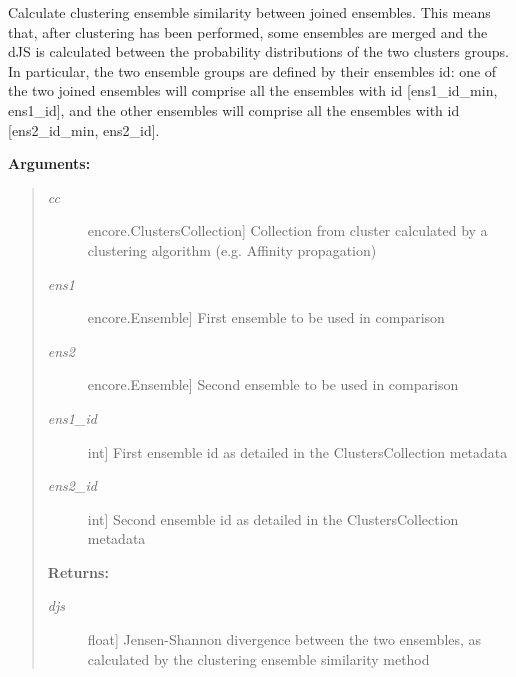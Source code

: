 \documentclass[letterpaper,10pt,english]{sphinxmanual}
\begin{document}
\begin{fulllineitems}
\label{index:encore.similarity.cumulative_clustering_ensemble_similarity}
Calculate clustering ensemble similarity between joined ensembles. This means that, after clustering has been performed, some ensembles are merged and the dJS is calculated between the probability distributions of the two clusters groups. In particular, the two ensemble groups are defined by their ensembles id: one of the two joined ensembles will comprise all the ensembles with id {[}ens1\_id\_min, ens1\_id{]}, and the other ensembles will comprise all the ensembles with id {[}ens2\_id\_min, ens2\_id{]}.

\textbf{Arguments:}
\begin{quote}
\begin{description}
\item[{\emph{cc}}] \leavevmode{[}encore.ClustersCollection{]}
Collection from cluster calculated by a clustering algorithm (e.g. Affinity propagation)

\item[{\emph{ens1}}] \leavevmode{[}encore.Ensemble{]}
First ensemble to be used in comparison

\item[{\emph{ens2}}] \leavevmode{[}encore.Ensemble{]}
Second ensemble to be used in comparison

\item[{\emph{ens1\_id}}] \leavevmode{[}int{]}
First ensemble id as detailed in the ClustersCollection metadata

\item[{\emph{ens2\_id}}] \leavevmode{[}int{]}
Second ensemble id as detailed in the ClustersCollection metadata

\end{description}

\textbf{Returns:}
\begin{description}
\item[{\emph{djs}}] \leavevmode{[}float{]}
Jensen-Shannon divergence between the two ensembles, as calculated by the clustering ensemble similarity method

\end{description}
\end{quote}

\end{fulllineitems}
\end{document}
